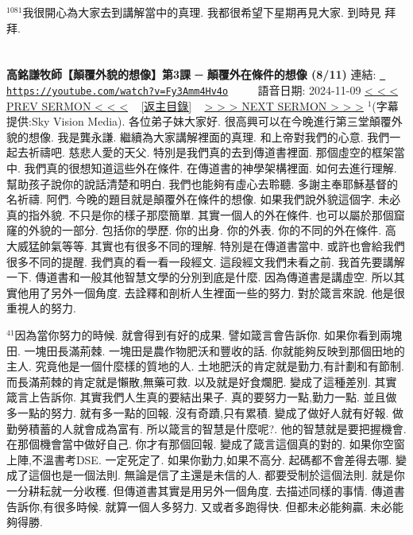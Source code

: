 \documentclass{book}
\begin{document}
$^{1081}$我很開心為大家去到講解當中的真理.
我都很希望下星期再見大家.
到時見 拜拜.
\newpage



\section{}
\label{sec:Fy3Amm4Hv4o}
\textbf{高銘謙牧師【顛覆外貌的想像】第3課 ─ 顛覆外在條件的想像 (8/11)}
\newline
\newline
連結: \href{https://youtube.com/watch?v=Fy3Amm4Hv4o}{\texttt{ https://youtube.com/watch?v=Fy3Amm4Hv4o}} ~~~~ 語音日期: 2024-11-09 
\newline
\newline
\hyperref[sec:ASwKQuSlcnY]{\small{< < < PREV SERMON < < <}}
~
\hyperref[sec:index]{\small{[返主目錄]}}
~
\hyperref[sec:etEqALQfL1A]{\small{> > > NEXT SERMON > > >}}
\newline
\newline
$^{1}$(字幕提供:Sky Vision Media).
各位弟子妹大家好.
很高興可以在今晚進行第三堂顛覆外貌的想像.
我是龔永謙.
繼續為大家講解裡面的真理.
和上帝對我們的心意.
我們一起去祈禱吧.
慈悲人愛的天父.
特別是我們真的去到傳道書裡面.
那個虛空的框架當中.
我們真的很想知道這些外在條件.
在傳道書的神學架構裡面.
如何去進行理解.
幫助孩子說你的說話清楚和明白.
我們也能夠有虛心去聆聽.
多謝主奉耶穌基督的名祈禱.
阿們.
今晚的題目就是顛覆外在條件的想像.
如果我們說外貌這個字.
未必真的指外貌.
不只是你的樣子那麼簡單.
其實一個人的外在條件.
也可以屬於那個窟窿的外貌的一部分.
包括你的學歷.
你的出身.
你的外表.
你的不同的外在條件.
高大威猛帥氣等等.
其實也有很多不同的理解.
特別是在傳道書當中.
或許也會給我們很多不同的提醒.
我們真的看一看一段經文.
這段經文我們未看之前.
我首先要講解一下.
傳道書和一般其他智慧文學的分別到底是什麼.
因為傳道書是講虛空.
所以其實他用了另外一個角度.
去詮釋和剖析人生裡面一些的努力.
對於箴言來說.
他是很重視人的努力.

$^{41}$因為當你努力的時候.
就會得到有好的成果.
譬如箴言會告訴你.
如果你看到兩塊田.
一塊田長滿荊棘.
一塊田是農作物肥沃和豐收的話.
你就能夠反映到那個田地的主人.
究竟他是一個什麼樣的質地的人.
土地肥沃的肯定就是勤力,有計劃和有節制.
而長滿荊棘的肯定就是懶散,無藥可救.
以及就是好食爛肥.
變成了這種差別.
其實箴言上告訴你.
其實我們人生真的要結出果子.
真的要努力一點,勤力一點.
並且做多一點的努力.
就有多一點的回報.
沒有奇蹟,只有累積.
變成了做好人就有好報.
做勤勞積蓄的人就會成為富有.
所以箴言的智慧是什麼呢?.
他的智慧就是要把握機會.
在那個機會當中做好自己.
你才有那個回報.
變成了箴言這個真的對的.
如果你空窗上陣,不溫書考DSE.
一定死定了.
如果你勤力,如果不高分.
起碼都不會差得去哪.
變成了這個也是一個法則.
無論是信了主還是未信的人.
都要受制於這個法則.
就是你一分耕耘就一分收穫.
但傳道書其實是用另外一個角度.
去描述同樣的事情.
傳道書告訴你,有很多時候.
就算一個人多努力.
又或者多跑得快.
但都未必能夠贏.
未必能夠得勝.
\end{document}
